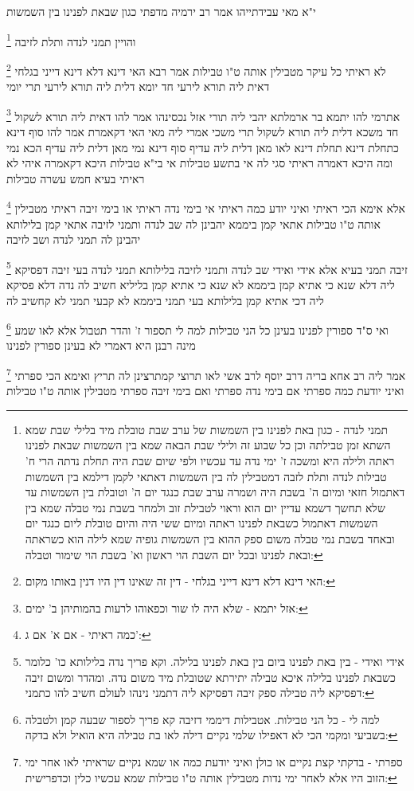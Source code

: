 \documentclass[12pt, openany]{book}
\newcommand{\footnotecomment}[1]{
	\renewcommand\thefootnote{}
	\footnote{#1}}
\newcommand{\commenta}[1]{\footnotecomment{#1}}
\begin{document}
{{י"א מאי עבידתייהו אמר רב ירמיה מדפתי כגון שבאת לפנינו בין השמשות
\commenta{תמני לנדה - כגון באת לפנינו בין השמשות של ערב שבת טובלת מיד בלילי שבת שמא השתא זמן טבילתה וכן כל שבוע זה ולילי שבת הבאה שמא בין השמשות שבאת לפנינו ראתה ולילה היא ומשכה ז' ימי נדה עד עכשיו ולפי שיום שבת היה תחלת נדתה הרי ח' טבילות לנדה ותלת לזבה דמטבילין לה בין השמשות דאתאי לקמן דילמא בין השמשות דאתמול חזאי ומיום ה' בשבת היה ושמרה ערב שבת כנגד יום ה' וטובלת בין השמשות עד שלא תחשך דשמא עדיין יום הוא וראוי לטבילת זוב ולמחר בשבת נמי טבלה שמא בין השמשות דאתמול כשבאת לפנינו ראתה ומיום ששי היה והיום טובלת ליום כנגד יום ובאחד בשבת נמי טבלה משום ספק ההוא בין השמשות גופיה שמא לילה הוא כשראתה ובאת לפנינו ובכל יום השבת הוי ראשון וא' בשבת הוי שימור וטבלה:}
והויין תמני לנדה ותלת לזיבה 
\commenta{האי דינא דלא דינא דייני בגלחי - דין זה שאינו דין היו דנין באותו מקום:}
לא ראיתי כל עיקר מטבילין אותה ט"ו טבילות אמר רבא האי דינא דלא דינא דייני בגלחי דאית ליה תורא לירעי חד יומא דלית ליה תורא לירעי תרי יומי 
\commenta{אזל יתמא - שלא היה לו שור וכפאוהו לרעות בהמותיהן ב' ימים:}
אתרמי להו יתמא בר ארמלתא יהבי ליה תורי אזל נכסינהו אמר להו דאית ליה תורא לשקול חד משכא דלית ליה תורא לשקול תרי משכי אמרי ליה מאי האי דקאמרת אמר להו סוף דינא כתחלת דינא תחלת דינא לאו מאן דלית ליה עדיף סוף דינא נמי מאן דלית ליה עדיף 
הכא נמי ומה היכא דאמרה ראיתי סגי לה אי בתשע טבילות אי בי"א טבילות היכא דקאמרה איהי לא ראיתי בעיא חמש עשרה טבילות 
\commenta{כמה ראיתי - אם א' אם ג':}
אלא אימא הכי ראיתי ואיני יודע כמה ראיתי אי בימי נדה ראיתי או בימי זיבה ראיתי מטבילין אותה ט"ו טבילות אתאי קמן ביממא יהבינן לה שב לנדה
ותמני לזיבה אתאי קמן בלילותא יהבינן לה תמני לנדה ושב לזיבה
\commenta{אידי ואידי - בין באת לפנינו ביום בין באת לפנינו בלילה. וקא פריך נדה בלילותא כו' כלומר כשבאת לפנינו בלילה איכא טבילה יתירתא שטובלת מיד משום נדה. ומהדר ומשום זיבה דפסיקא ליה טבילה ספק זיבה דפסיקא ליה דתמני נינהו לעולם חשיב להו כתמני:}
זיבה תמני בעיא אלא אידי ואידי שב לנדה ותמני לזיבה
בלילותא תמני לנדה בעי 
זיבה דפסיקא ליה דלא שנא כי אתיא קמן ביממא לא שנא כי אתיא קמן בליליא חשיב לה נדה דלא פסיקא ליה דכי אתיא קמן בלילותא בעי תמני ביממא לא קבעי תמני לא קחשיב לה 
\commenta{למה לי - כל הני טבילות. אטבילות דיממי דזיבה קא פריך לספור שבעה קמן ולטבלה בשביעי ומקמי הכי לא דאפילו שלמי נקיים דילה לאו בת טבילה היא הואיל ולא בדקה:}
ואי ס"ד ספורין לפנינו בעינן כל הני טבילות למה לי תספור ז' והדר תטבול אלא לאו שמע מינה רבנן היא דאמרי לא בעינן ספורין לפנינו 
\commenta{ספרתי - בדקתי קצת נקיים או כולן ואיני יודעת כמה או שמא נקיים שראיתי לאו אחר ימי הזוב היו אלא לאחר ימי נדות מטבילין אותה ט"ו טבילות שמא עכשיו כלין וכדפרישית:}
אמר ליה רב אחא בריה דרב יוסף לרב אשי לאו תרוצי קמתרצינן לה תריץ ואימא הכי ספרתי ואיני יודעת כמה ספרתי אם בימי נדה ספרתי ואם בימי זיבה ספרתי מטבילין אותה ט"ו טבילות 
}}
\end{document}
